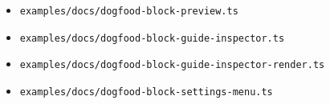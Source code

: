 \begin{itemize}
  \begin{itemize}
  \tightlist
  \item
    \texttt{e\allowbreak{}x\allowbreak{}a\allowbreak{}m\allowbreak{}p\allowbreak{}l\allowbreak{}e\allowbreak{}s\allowbreak{}/\allowbreak{}d\allowbreak{}o\allowbreak{}c\allowbreak{}s\allowbreak{}/\allowbreak{}d\allowbreak{}o\allowbreak{}g\allowbreak{}f\allowbreak{}o\allowbreak{}o\allowbreak{}d\allowbreak{}-\allowbreak{}b\allowbreak{}l\allowbreak{}o\allowbreak{}c\allowbreak{}k\allowbreak{}-\allowbreak{}p\allowbreak{}r\allowbreak{}e\allowbreak{}v\allowbreak{}i\allowbreak{}e\allowbreak{}w\allowbreak{}.\allowbreak{}t\allowbreak{}s}
  \item
    \texttt{e\allowbreak{}x\allowbreak{}a\allowbreak{}m\allowbreak{}p\allowbreak{}l\allowbreak{}e\allowbreak{}s\allowbreak{}/\allowbreak{}d\allowbreak{}o\allowbreak{}c\allowbreak{}s\allowbreak{}/\allowbreak{}d\allowbreak{}o\allowbreak{}g\allowbreak{}f\allowbreak{}o\allowbreak{}o\allowbreak{}d\allowbreak{}-\allowbreak{}b\allowbreak{}l\allowbreak{}o\allowbreak{}c\allowbreak{}k\allowbreak{}-\allowbreak{}g\allowbreak{}u\allowbreak{}i\allowbreak{}d\allowbreak{}e\allowbreak{}-\allowbreak{}i\allowbreak{}n\allowbreak{}s\allowbreak{}p\allowbreak{}e\allowbreak{}c\allowbreak{}t\allowbreak{}o\allowbreak{}r\allowbreak{}.\allowbreak{}t\allowbreak{}s}
  \item
    \texttt{e\allowbreak{}x\allowbreak{}a\allowbreak{}m\allowbreak{}p\allowbreak{}l\allowbreak{}e\allowbreak{}s\allowbreak{}/\allowbreak{}d\allowbreak{}o\allowbreak{}c\allowbreak{}s\allowbreak{}/\allowbreak{}d\allowbreak{}o\allowbreak{}g\allowbreak{}f\allowbreak{}o\allowbreak{}o\allowbreak{}d\allowbreak{}-\allowbreak{}b\allowbreak{}l\allowbreak{}o\allowbreak{}c\allowbreak{}k\allowbreak{}-\allowbreak{}g\allowbreak{}u\allowbreak{}i\allowbreak{}d\allowbreak{}e\allowbreak{}-\allowbreak{}i\allowbreak{}n\allowbreak{}s\allowbreak{}p\allowbreak{}e\allowbreak{}c\allowbreak{}t\allowbreak{}o\allowbreak{}r\allowbreak{}-\allowbreak{}r\allowbreak{}e\allowbreak{}n\allowbreak{}d\allowbreak{}e\allowbreak{}r\allowbreak{}.\allowbreak{}t\allowbreak{}s}
  \item
    \texttt{e\allowbreak{}x\allowbreak{}a\allowbreak{}m\allowbreak{}p\allowbreak{}l\allowbreak{}e\allowbreak{}s\allowbreak{}/\allowbreak{}d\allowbreak{}o\allowbreak{}c\allowbreak{}s\allowbreak{}/\allowbreak{}d\allowbreak{}o\allowbreak{}g\allowbreak{}f\allowbreak{}o\allowbreak{}o\allowbreak{}d\allowbreak{}-\allowbreak{}b\allowbreak{}l\allowbreak{}o\allowbreak{}c\allowbreak{}k\allowbreak{}-\allowbreak{}s\allowbreak{}e\allowbreak{}t\allowbreak{}t\allowbreak{}i\allowbreak{}n\allowbreak{}g\allowbreak{}s\allowbreak{}-\allowbreak{}m\allowbreak{}e\allowbreak{}n\allowbreak{}u\allowbreak{}.\allowbreak{}t\allowbreak{}s}

\end{itemize}
\end{itemize}

